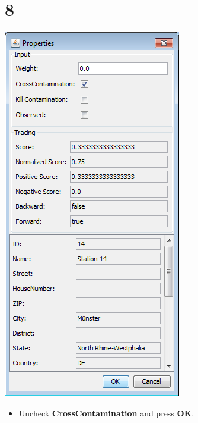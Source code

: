 \documentclass{beamer}
\begin{document}
\section{8}
\begin{frame}
	\begin{center}
  		\includegraphics[height=0.6\textheight]{8.png}
	\end{center}
	\begin{itemize}
		\item Uncheck \textbf{CrossContamination} and press \textbf{OK}.
	\end{itemize}
\end{frame}
\end{document}
